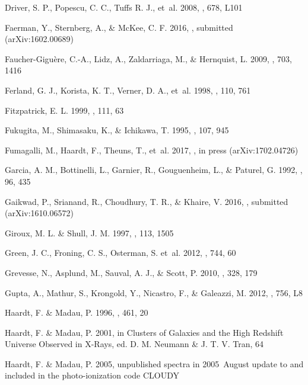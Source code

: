 \documentclass[twocolumn,twocolappendix,tighten,times]{aastex6}
\begin{document}
\begin{thebibliography}
 Driver, S. P., Popescu, C. C., Tuffs R. J., et~al. 2008, \apjl, 678, L101

 Faerman, Y., Sternberg, A., \& McKee, C. F. 2016, \apj, submitted (arXiv:1602.00689)

 Faucher-Gigu\`ere, C.-A., Lidz, A., Zaldarriaga, M., \& Hernquist, L. 2009, \apj, 703, 1416

 Ferland, G. J., Korista, K. T., Verner, D. A., et~al. 1998, \pasp, 110, 761

 Fitzpatrick, E. L. 1999, \pasp, 111, 63

 Fukugita, M., Shimasaku, K., \& Ichikawa, T. 1995, \pasp, 107, 945

 Fumagalli, M., Haardt, F., Theuns, T., et~al. 2017, \mnras, in press (arXiv:1702.04726)

 Garcia, A. M., Bottinelli, L., Garnier, R., Gouguenheim, L., \& Paturel, G. 1992, \aaps, 96, 435

 Gaikwad, P., Srianand, R., Choudhury, T. R., \& Khaire, V. 2016, \mnras, submitted (arXiv:1610.06572)

 Giroux, M. L. \& Shull, J. M. 1997, \aj, 113, 1505

 Green, J. C., Froning, C. S., Osterman, S. et~al. 2012, \apj, 744, 60

 Grevesse, N., Asplund, M., Sauval, A. J., \& Scott, P. 2010, \apss, 328, 179

 Gupta, A., Mathur, S., Krongold, Y., Nicastro, F., \& Galeazzi, M. 2012, \apj, 756, L8

 Haardt, F. \& Madau, P. 1996, \apj, 461, 20

 Haardt, F. \& Madau, P. 2001, in Clusters of Galaxies and the High Redshift Universe Observed in X-Rays, ed. D. M. Neumann \& J. T. V. Tran, 64

 Haardt, F. \& Madau, P. 2005, unpublished spectra in 2005~August update to \citet{haardt01} and included in the photo-ionization code CLOUDY


\end{thebibliography}
\end{document}

